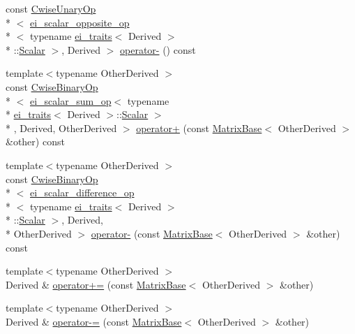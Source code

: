 \begin{DoxyCompactItemize}
const \hyperlink{class_cwise_unary_op}{Cwise\-Unary\-Op}\\*
$<$ \hyperlink{structei__scalar__opposite__op}{ei\-\_\-scalar\-\_\-opposite\-\_\-op}\\*
$<$ typename \hyperlink{structei__traits}{ei\-\_\-traits}$<$ Derived $>$\\*
\-::\hyperlink{class_matrix_base_a625df8339dc2d816cbc0fd66e7dadaf5}{Scalar} $>$, Derived $>$ \hyperlink{class_matrix_base_af3aa6c8c1fba1da61e49bca0512f781d}{operator-\/} () const 
\item 
{\footnotesize template$<$typename Other\-Derived $>$ }\\const \hyperlink{class_cwise_binary_op}{Cwise\-Binary\-Op}\\*
$<$ \hyperlink{structei__scalar__sum__op}{ei\-\_\-scalar\-\_\-sum\-\_\-op}$<$ typename \\*
\hyperlink{structei__traits}{ei\-\_\-traits}$<$ Derived $>$\-::\hyperlink{class_matrix_base_a625df8339dc2d816cbc0fd66e7dadaf5}{Scalar} $>$\\*
, Derived, Other\-Derived $>$ \hyperlink{class_matrix_base_a8d295cd832cd4c42a947558e1297e19a}{operator+} (const \hyperlink{class_matrix_base}{Matrix\-Base}$<$ Other\-Derived $>$ \&other) const 
\item 
{\footnotesize template$<$typename Other\-Derived $>$ }\\const \hyperlink{class_cwise_binary_op}{Cwise\-Binary\-Op}\\*
$<$ \hyperlink{structei__scalar__difference__op}{ei\-\_\-scalar\-\_\-difference\-\_\-op}\\*
$<$ typename \hyperlink{structei__traits}{ei\-\_\-traits}$<$ Derived $>$\\*
\-::\hyperlink{class_matrix_base_a625df8339dc2d816cbc0fd66e7dadaf5}{Scalar} $>$, Derived, \\*
Other\-Derived $>$ \hyperlink{class_matrix_base_a8f6e447daaacca41386e0c79ca0bfbbc}{operator-\/} (const \hyperlink{class_matrix_base}{Matrix\-Base}$<$ Other\-Derived $>$ \&other) const 
\item 
{\footnotesize template$<$typename Other\-Derived $>$ }\\Derived \& \hyperlink{class_matrix_base_a11130398cd1d288ec5c6a62fc06f95f2}{operator+=} (const \hyperlink{class_matrix_base}{Matrix\-Base}$<$ Other\-Derived $>$ \&other)
\item 
{\footnotesize template$<$typename Other\-Derived $>$ }\\Derived \& \hyperlink{class_matrix_base_acfe346a7989d57588f9f07d95f375ff4}{operator-\/=} (const \hyperlink{class_matrix_base}{Matrix\-Base}$<$ Other\-Derived $>$ \&other)

\end{DoxyCompactItemize}
